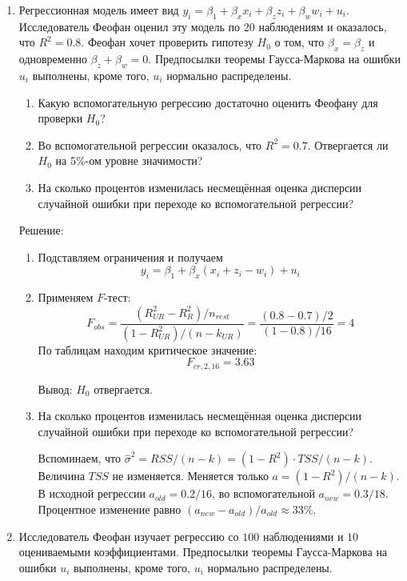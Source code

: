 \documentclass[12pt]{article} %
\begin{document}
\begin{enumerate}

\item Регрессионная модель имеет вид $y_i= \beta_1+ \beta_x x_{i}+ \beta_z z_{i}+ \beta_w w_{i}+u_i$. Исследователь Феофан оценил эту модель по 20 наблюдениям и оказалось, что $R^2=0.8$. Феофан хочет проверить гипотезу $H_0$ о том, что $\beta_x = \beta_z$ и одновременно $\beta_z + \beta_w = 0$. Предпосылки теоремы Гаусса-Маркова на ошибки $u_i$ выполнены, кроме того, $u_i$ нормально распределены.

\begin{enumerate}
\item Какую вспомогательную регрессию достаточно оценить Феофану для проверки $H_0$?
\item Во вспомогательной регрессии оказалось, что $R^2 = 0.7$. Отвергается ли $H_0$ на 5\%-ом уровне значимости?
\item На сколько процентов изменилась несмещённая оценка дисперсии случайной ошибки при переходе ко вспомогательной регрессии?
\end{enumerate}

Решение:

\begin{enumerate}
\item Подставляем ограничения и получаем
\[
y_i = \beta_1 + \beta_x (x_i + z_i - w_i) + u_i
\]
\item Применяем $F$-тест:
\[
F_{obs} = \frac{(R^2_{UR} - R^2_{R})/n_{rest}}{(1-R^2_{UR})/(n-k_{UR})} = \frac{(0.8-0.7)/2}{(1-0.8)/16}=4
\]
По таблицам находим критическое значение:
\[
F_{cr, 2, 16} = 3.63
\]

Вывод: $H_0$ отвергается.

\item На сколько процентов изменилась несмещённая оценка дисперсии случайной ошибки при переходе ко вспомогательной регрессии?

Вспоминаем, что $\hat{\sigma}^2 = RSS/ (n-k) = (1-R^2)\cdot TSS/(n-k)$. Величина $TSS$ не изменяется. Меняется только $a=(1-R^2)/(n-k)$. В исходной регрессии $a_{old}=0.2/16$, во вспомогательной $a_{new}=0.3/18$. Процентное изменение равно $(a_{new} - a_{old})/a_{old} \approx 33\%$.

\end{enumerate}

\item Исследователь Феофан изучает регрессию со $100$ наблюдениями и $10$ оцениваемыми коэффициентами. Предпосылки теоремы Гаусса-Маркова на ошибки $u_i$ выполнены, кроме того, $u_i$ нормально распределены.


\end{enumerate}
\end{document}
